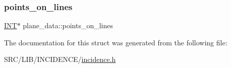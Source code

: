 \subsubsection{\texorpdfstring{points\+\_\+on\+\_\+lines}{points\_on\_lines}}
{\footnotesize\ttfamily \mbox{\hyperlink{galois_8h_a09fddde158a3a20bd2dcadb609de11dc}{I\+NT}}$\ast$ plane\+\_\+data\+::points\+\_\+on\+\_\+lines}



The documentation for this struct was generated from the following file\+:\begin{DoxyCompactItemize}
\item 
S\+R\+C/\+L\+I\+B/\+I\+N\+C\+I\+D\+E\+N\+C\+E/\mbox{\hyperlink{incidence_8h}{incidence.\+h}}\end{DoxyCompactItemize}

